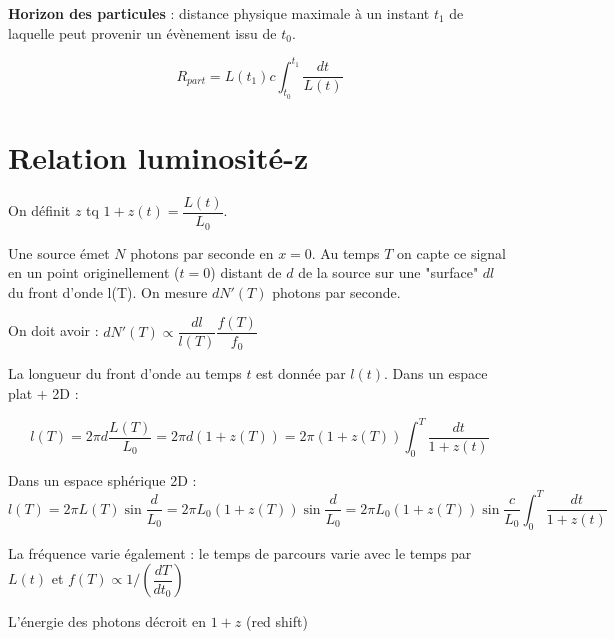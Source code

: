 \documentclass[11pt]{article} %
\newcommand{\dint}{\displaystyle \int}
\begin{document}
\textbf{Horizon des particules} : distance physique maximale à un instant $t_1$ de laquelle peut provenir un évènement issu de $t_0$.

\begin{equation}
R_{part} = L(t_1) c \dint_{t_0}^{t_1} \dfrac{dt}{L(t)}
\end{equation}

\section{Relation luminosité-z}

On définit $z$ tq $1+z(t) = \dfrac{L(t)}{L_0}$.

Une source émet $N$ photons par seconde en $x = 0$. Au temps $T$ on capte ce signal en un point originellement ($t = 0$) distant de $d$ de la source sur une "surface" $dl$ du front d'onde l(T). On mesure $dN'(T)$ photons par seconde.

On doit avoir :
$dN'(T) \propto \dfrac{dl}{l(T)} \dfrac{f(T)}{f_0}$


La longueur du front d'onde au temps $t$ est donnée par $l(t)$. Dans un espace plat + 2D :

\begin{equation}
l(T) = 2\pi d \dfrac{L(T)}{L_0} = 2\pi d (1+z(T)) = 2\pi (1+z(T)) \dint_0^T \dfrac{dt}{1+z(t)}
\end{equation}

Dans un espace sphérique 2D :
\begin{equation}
l(T) = 2\pi L(T) \sin \dfrac{d}{L_0} = 2\pi L_0 (1+z(T)) \sin \dfrac{d}{L_0}  = 2\pi L_0 (1+z(T)) \sin \dfrac{c}{L_0} \dint_0^T \dfrac{dt}{1+z(t)}
\end{equation}

La fréquence varie également : le temps de parcours varie avec le temps par $L(t)$ et $f(T) \propto 1/(\dfrac{dT}{dt_0})$


L'énergie des photons décroit en $1+z$ (red shift) 
\end{document}
